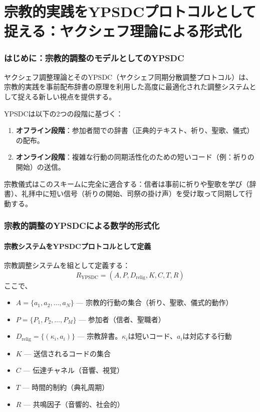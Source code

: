 \documentclass[12pt,a4paper]{article}
\begin{document}
	\tableofcontents
	
	\newpage
	
	\part{宗教的実践をYPSDCプロトコルとして捉える：ヤクシェフ理論による形式化}
	
	\section{はじめに：宗教的調整のモデルとしてのYPSDC}
	
	ヤクシェフ調整理論とそのYPSDC（ヤクシェフ同期分散調整プロトコル）は、宗教的実践を事前配布辞書の原理を利用した高度に最適化された調整システムとして捉える新しい視点を提供する。
	
	YPSDCは以下の2つの段階に基づく：
	\begin{enumerate}
		\item \textbf{オフライン段階}：参加者間での辞書（正典的テキスト、祈り、聖歌、儀式）の配布。
		\item \textbf{オンライン段階}：複雑な行動の同期活性化のための短いコード（例：祈りの開始）の送信。
	\end{enumerate}
	
	宗教儀式はこのスキームに完全に適合する：信者は事前に祈りや聖歌を学び（辞書）、礼拝中に短い信号（祈りの開始、司祭の掛け声）を受け取って同期して行動する。
	
	\section{宗教的調整のYPSDCによる数学的形式化}
	
	\subsection{宗教システムをYPSDCプロトコルとして定義}
	
	宗教調整システムを組として定義する：
	\[
	R_{\mathrm{YPSDC}} = (A, P, D_{\mathrm{relig}}, K, C, T, R)
	\]
	ここで、
	\begin{itemize}
		\item $A = \{a_1, a_2, \ldots, a_N\}$ — 宗教的行動の集合（祈り、聖歌、儀式的動作）
		\item $P = \{P_1, P_2, \ldots, P_M\}$ — 参加者（信者、聖職者）
		\item $D_{\mathrm{relig}} = \{(\kappa_i, a_i)\}$ — 宗教辞書。$\kappa_i$は短いコード、$a_i$は対応する行動
		\item $K$ — 送信されるコードの集合
		\item $C$ — 伝達チャネル（音響、視覚）
		\item $T$ — 時間的制約（典礼周期）
		\item $R$ — 共鳴因子（音響的、社会的）
	\end{itemize}
	
\end{document}
